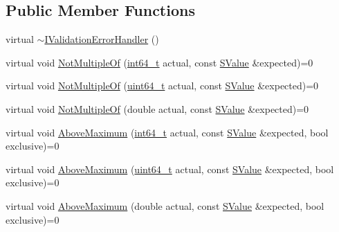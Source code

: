 \subsection*{Public Member Functions}
\begin{DoxyCompactItemize}
\item 
virtual \mbox{\hyperlink{classrapidjson_1_1internal_1_1_i_validation_error_handler_a54f99921bac27dbcdab23ac6833ef862}{$\sim$\+I\+Validation\+Error\+Handler}} ()
\item 
virtual void \mbox{\hyperlink{classrapidjson_1_1internal_1_1_i_validation_error_handler_a2dcb25e9e8550903cac1c9dd8286b7a3}{Not\+Multiple\+Of}} (\mbox{\hyperlink{stdint_8h_a414156feea104f8f75b4ed9e3121b2f6}{int64\+\_\+t}} actual, const \mbox{\hyperlink{classrapidjson_1_1internal_1_1_i_validation_error_handler_a8a2aaf7eb28a3ce7ed81689141f3af1f}{S\+Value}} \&expected)=0
\item 
virtual void \mbox{\hyperlink{classrapidjson_1_1internal_1_1_i_validation_error_handler_a253234dc0dc3d1b47b486cf157377cc2}{Not\+Multiple\+Of}} (\mbox{\hyperlink{stdint_8h_aec6fcb673ff035718c238c8c9d544c47}{uint64\+\_\+t}} actual, const \mbox{\hyperlink{classrapidjson_1_1internal_1_1_i_validation_error_handler_a8a2aaf7eb28a3ce7ed81689141f3af1f}{S\+Value}} \&expected)=0
\item 
virtual void \mbox{\hyperlink{classrapidjson_1_1internal_1_1_i_validation_error_handler_ae0f755b69029d325a3acb78290b6017c}{Not\+Multiple\+Of}} (double actual, const \mbox{\hyperlink{classrapidjson_1_1internal_1_1_i_validation_error_handler_a8a2aaf7eb28a3ce7ed81689141f3af1f}{S\+Value}} \&expected)=0
\item 
virtual void \mbox{\hyperlink{classrapidjson_1_1internal_1_1_i_validation_error_handler_a7cb6baae6be998560d17e06cba8a3c0c}{Above\+Maximum}} (\mbox{\hyperlink{stdint_8h_a414156feea104f8f75b4ed9e3121b2f6}{int64\+\_\+t}} actual, const \mbox{\hyperlink{classrapidjson_1_1internal_1_1_i_validation_error_handler_a8a2aaf7eb28a3ce7ed81689141f3af1f}{S\+Value}} \&expected, bool exclusive)=0
\item 
virtual void \mbox{\hyperlink{classrapidjson_1_1internal_1_1_i_validation_error_handler_af0a7dcbd3f67cef69afb718be0221323}{Above\+Maximum}} (\mbox{\hyperlink{stdint_8h_aec6fcb673ff035718c238c8c9d544c47}{uint64\+\_\+t}} actual, const \mbox{\hyperlink{classrapidjson_1_1internal_1_1_i_validation_error_handler_a8a2aaf7eb28a3ce7ed81689141f3af1f}{S\+Value}} \&expected, bool exclusive)=0
\item 
virtual void \mbox{\hyperlink{classrapidjson_1_1internal_1_1_i_validation_error_handler_a134465169804f03198dcd528a158a68c}{Above\+Maximum}} (double actual, const \mbox{\hyperlink{classrapidjson_1_1internal_1_1_i_validation_error_handler_a8a2aaf7eb28a3ce7ed81689141f3af1f}{S\+Value}} \&expected, bool exclusive)=0

\end{DoxyCompactItemize}
